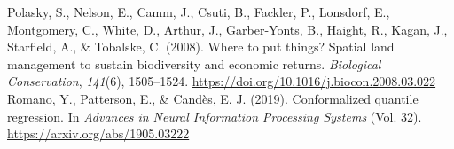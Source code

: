 \documentclass[10pt]{article}
\begin{document}
\begin{thebibliography}{}
Polasky, S., Nelson, E., Camm, J., Csuti, B., Fackler, P., Lonsdorf, E., Montgomery, C., White, D., Arthur, J., Garber-Yonts, B., Haight, R., Kagan, J., Starfield, A., \& Tobalske, C. (2008). Where to put things? Spatial land management to sustain biodiversity and economic returns. {\itshape Biological Conservation}, {\itshape 141}(6), 1505–1524. \url{https://doi.org/10.1016/j.biocon.2008.03.022}
Romano, Y., Patterson, E., \& Cand\`es, E. J. (2019). Conformalized quantile regression. In {\itshape Advances in Neural Information Processing Systems} (Vol. 32). \url{https://arxiv.org/abs/1905.03222}
\end{thebibliography}
\end{document}
